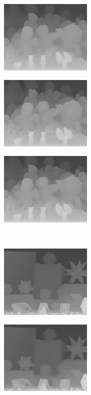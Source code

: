 \documentclass[preprint,10pt,5p,times,twocolumn]{elsarticle}
\begin{document}
\begin{figure}
\begin{subfigure}[b]{0.24\textwidth}
\end{subfigure}
\begin{subfigure}[b]{0.24\textwidth}
\includegraphics[height= 3.5cm, width=\textwidth]{fig_dolls_8X_noise_lqdai.png}
\end{subfigure}
\begin{subfigure}[b]{0.24\textwidth}
\includegraphics[height= 3.5cm, width=\textwidth]{fig_dolls_8X_noise_cvpr.png}
\end{subfigure}
\begin{subfigure}[b]{0.24\textwidth}
\includegraphics[height= 3.5cm, width=\textwidth]{fig_dolls_8X_noise_iccv.png}
\end{subfigure}
\\ \vspace{0.1cm}
\begin{subfigure}[b]{0.24\textwidth}
\includegraphics[height= 3.5cm, width=\textwidth]{fig_moebius.png}
\end{subfigure}
\begin{subfigure}[b]{0.24\textwidth}
\includegraphics[height= 3.5cm, width=\textwidth]{fig_moebius_8X_noise_lqdai.png}

\end{subfigure}
\end{figure}
\end{document}
